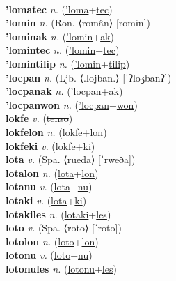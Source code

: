  \label{'loma'kilistosfitilip} \\
\textbf{'lomatec} \textit{n.} (\hyperref['loma]{'loma}+\hyperref[tec]{tec})
 \label{'lomatec} \\
\textbf{'lomin} \textit{n.} (Ron. ⟨român⟩ [romɨn])
 \label{'lomin} \\
\textbf{'lominak} \textit{n.} (\hyperref['lomin]{'lomin}+\hyperref[ak]{ak})
 \label{'lominak} \\
\textbf{'lomintec} \textit{n.} (\hyperref['lomin]{'lomin}+\hyperref[tec]{tec})
 \label{'lomintec} \\
\textbf{'lomintilip} \textit{n.} (\hyperref['lomin]{'lomin}+\hyperref[tilip]{tilip})
 \label{'lomintilip} \\
\textbf{'locpan} \textit{n.} (Ljb. ⟨.lojban.⟩ [ˈʔloʒbanʔ])
 \label{'locpan} \\
\textbf{'locpanak} \textit{n.} (\hyperref['locpan]{'locpan}+\hyperref[ak]{ak})
 \label{'locpanak} \\
\textbf{'locpanwon} \textit{n.} (\hyperref['locpan]{'locpan}+\hyperref[won]{won})
 \label{'locpanwon} \\
\textbf{lokfe} \textit{v.} (\hyperref[tenso]{\sout{tenso}})
 \label{lokfe} \\
\textbf{lokfelon} \textit{n.} (\hyperref[lokfe]{lokfe}+\hyperref[lon]{lon})
 \label{lokfelon} \\
\textbf{lokfeki} \textit{v.} (\hyperref[lokfe]{lokfe}+\hyperref[ki]{ki})
 \label{lokfeki} \\
\textbf{lota} \textit{v.} (Spa. ⟨rueda⟩ [ˈrweða])
 \label{lota} \\
\textbf{lotalon} \textit{n.} (\hyperref[lota]{lota}+\hyperref[lon]{lon})
 \label{lotalon} \\
\textbf{lotanu} \textit{v.} (\hyperref[lota]{lota}+\hyperref[nu]{nu})
 \label{lotanu} \\
\textbf{lotaki} \textit{v.} (\hyperref[lota]{lota}+\hyperref[ki]{ki})
 \label{lotaki} \\
\textbf{lotakiles} \textit{n.} (\hyperref[lotaki]{lotaki}+\hyperref[les]{les})
 \label{lotakiles} \\
\textbf{loto} \textit{v.} (Spa. ⟨roto⟩ [ˈroto])
 \label{loto} \\
\textbf{lotolon} \textit{n.} (\hyperref[loto]{loto}+\hyperref[lon]{lon})
 \label{lotolon} \\
\textbf{lotonu} \textit{v.} (\hyperref[loto]{loto}+\hyperref[nu]{nu})
 \label{lotonu} \\
\textbf{lotonules} \textit{n.} (\hyperref[lotonu]{lotonu}+\hyperref[les]{les})

